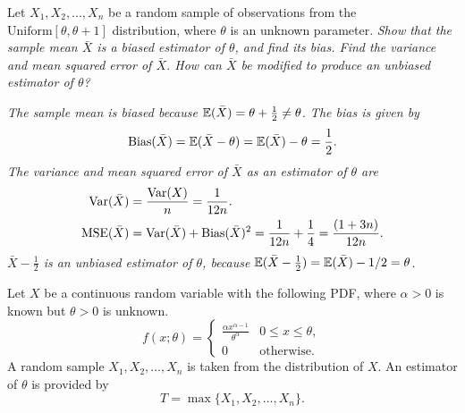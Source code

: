 \begin{exercise}
\begin{questions}

\question
Let $X_1, X_2, ...,X_n$ be a random sample of observations from the $\text{Uniform}[\theta,\theta+1]$ distribution, where $\theta$ is an unknown parameter.
\ben
\it Show that the sample mean $\bar{X}$ is a biased estimator of $\theta$, and find its bias.
\it Find the variance and mean squared error of $\bar{X}$.
\it How can $\bar{X}$ be modified to produce an unbiased estimator of $\theta$?
\een
\begin{answer}
\ben
\it %
The sample mean is biased because $\mathbb{E}(\bar{X}) = \theta +\frac{1}{2} \neq \theta$. The bias is given by
\[
\text{Bias}(\bar{X}) = \mathbb{E}(\bar{X}-\theta) = \mathbb{E}(\bar{X})-\theta = \frac{1}{2}.
\]
\it %
The variance and mean squared error of $\bar{X}$ as an estimator of $\theta$ are
\begin{align*}
\text{Var}(\bar{X})
	& = \frac{\text{Var}(X)}{n} = \frac{1}{12n}. \\
\text{MSE}(\bar{X})
	&  = \text{Var}(\bar{X}) + \text{Bias}(\bar{X})^{2} = \frac{1}{12n} + \frac{1}{4} = \frac{(1+3n)}{12n}.
\end{align*}
\it %
$\bar{X} -\frac{1}{2}$ is an unbiased estimator of ${\theta}$, because $\mathbb{E}(\bar{X} -\frac{1}{2}) =\mathbb{E}(\bar{X}) - 1/2 = \theta$. 
\een
\end{answer}

\question
Let $X$ be a continuous random variable with the following PDF, where $\alpha>0$ is known but $\theta>0$ is unknown. 
\[
f(x;\theta) = \begin{cases}
	\displaystyle \frac{\alpha x^{\alpha-1}}{\theta^{\alpha}}	& 0\leq x\leq \theta, \\[2ex]
	0															& \text{otherwise.}
\end{cases}
\]
A random sample $X_1,X_2,\ldots,X_n$ is taken from the distribution of $X$. An estimator of $\theta$ is provided by
\[
T = \max\{X_1,X_2,\ldots,X_n\}.
\]
\begin{parts}

\end{parts}
\end{questions}
\end{exercise}
